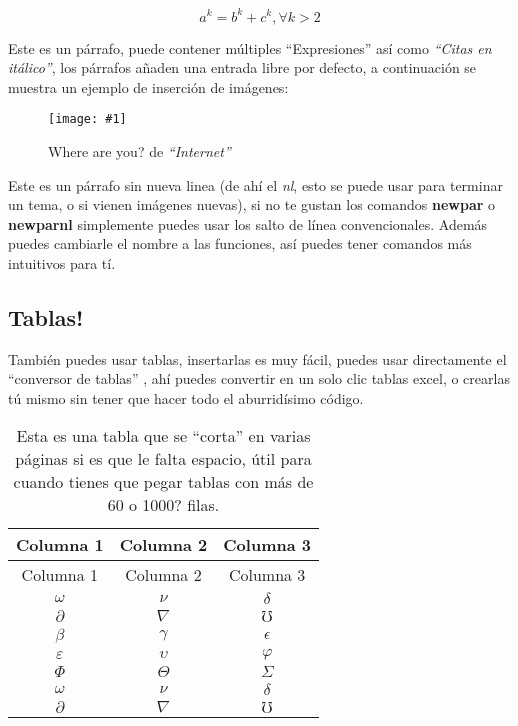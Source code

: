 \documentclass[letterpaper,11pt]{article}	%
\newcommand{\quotes}[1]{``#1''}		%
\newcommand{\quotesit}[1]{\textit{\quotes{#1}}}		%
\newcommand{\newpar}[1]{\hbadness=10000 #1 ~\newline \par}			%
\newcommand{\newparnl}[1]{#1 \par}		%
\newcommand{\pow}[2]{{#1}^{#2}}			%
\newcommand{\insertequation}[1]{ 			%
	\vspace{-0.1cm}
	\begin{mycapequ}[H]
		\begin{equation}
		#1
		\end{equation}
	\end{mycapequ}
	\vspace{-0.4cm}}
\newcommand{\insertimage}[3]{				%
	\vspace{-0.3cm}
	\begin{figure}[H]
		\centering
		\texttt{[image: \#1]}
		\caption{#3}
	\end{figure}
	\vspace{-0.2cm}}
\begin{document}
		\insertequation{\pow{a}{k}=\pow{b}{k}+\pow{c}{k}, \forall k>2}
		
		\newpar{Este es un párrafo, puede contener múltiples \quotes{Expresiones} así como \quotesit{Citas en itálico}, los párrafos añaden una entrada libre por defecto, a continuación se muestra un ejemplo de inserción de imágenes:}
		
		\insertimage{images/image.png}{0.2}{Where are you? de \quotesit{Internet}}
		
		\newparnl{Este es un párrafo sin nueva linea (de ahí el \textit{nl}, esto se puede usar para terminar un tema, o si vienen imágenes nuevas), si no te gustan los comandos \textbf{newpar} o \textbf{newparnl} simplemente puedes usar los salto de línea convencionales. Además puedes cambiarle el nombre a las funciones, así puedes tener comandos más intuitivos para tí.}
		
	\subsection{Tablas!}
		
		\newparnl{También puedes usar tablas, insertarlas es muy fácil, puedes usar directamente el \quotes{conversor de tablas} \textsuperscript{\cite{conversortabla}}, ahí puedes convertir en un solo clic tablas excel, o crearlas tú mismo sin tener que hacer todo el aburridísimo código.}
		
		\begin{longtable}{ccc}
			\caption{Esta es una tabla que se \quotes{corta} en varias páginas si es que le falta espacio, útil para cuando tienes que pegar tablas con más de 60 o 1000? filas.}\label{foo}\\
			\hline
			Columna 1 & Columna 2 & Columna 3\\\hline
			\endfirsthead
			\hline
			Columna 1 & Columna 2 & Columna 3\\
			\hline
			\endhead
			\hline
			\endfoot
			\hline
			\endlastfoot
			$\omega$ & $\nu$ & $\delta$\\     
			$\partial$ & $\nabla$ & $\mho$\\
			$\beta$ & $\gamma$ & $\epsilon$\\   
			$\varepsilon$ & $\upsilon$ & $\varphi$\\
			$\Phi$ & $\Theta$ & $\varSigma$\\
			$\omega$ & $\nu$ & $\delta$\\     
			$\partial$ & $\nabla$ & $\mho$\\ 
		\end{longtable}
		
\end{document}

